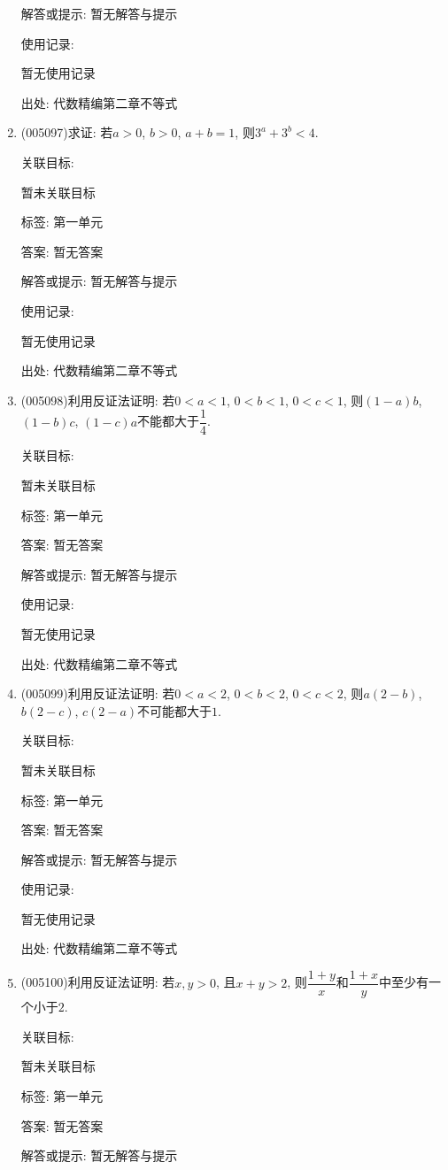 \documentclass[10pt,a4paper]{article}
\begin{document}
\begin{enumerate}[1.]
解答或提示: 暂无解答与提示

使用记录:

暂无使用记录


出处: 代数精编第二章不等式
\item { (005097)}求证: 若$a>0$, $b>0$, $a+b=1$, 则$3^a+3^b<4$.


关联目标:

暂未关联目标



标签: 第一单元

答案: 暂无答案

解答或提示: 暂无解答与提示

使用记录:

暂无使用记录


出处: 代数精编第二章不等式
\item { (005098)}利用反证法证明: 若$0<a<1$, $0<b<1$, $0<c<1$, 则$(1-a)b$, $(1-b)c$, $(1-c)a$不能都大于$\dfrac 14$.


关联目标:

暂未关联目标



标签: 第一单元

答案: 暂无答案

解答或提示: 暂无解答与提示

使用记录:

暂无使用记录


出处: 代数精编第二章不等式
\item { (005099)}利用反证法证明: 若$0<a<2$, $0<b<2$, $0<c<2$, 则$a(2-b)$, $b(2-c)$, $c(2-a)$不可能都大于$1$.


关联目标:

暂未关联目标



标签: 第一单元

答案: 暂无答案

解答或提示: 暂无解答与提示

使用记录:

暂无使用记录


出处: 代数精编第二章不等式
\item { (005100)}利用反证法证明: 若$x,y>0$, 且$x+y>2$, 则$\dfrac{1+y}x$和$\dfrac{1+x}y$中至少有一个小于$2$.


关联目标:

暂未关联目标



标签: 第一单元

答案: 暂无答案

解答或提示: 暂无解答与提示


\end{enumerate}
\end{document}
